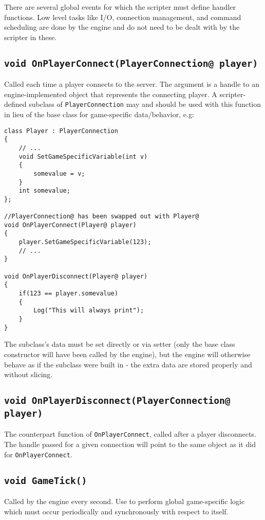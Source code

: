 \documentclass{book}
\begin{document}
There are several global events for which the scripter must define handler
functions. Low level tasks like I/O, connection management, and command
scheduling are done by the engine and do not need to be dealt with by the
scripter in these.

\subsection{\texttt{void OnPlayerConnect(PlayerConnection@ player)}}
  Called each time a player connects to the server. The argument is a handle to
  an engine-implemented object that represents the connecting player. A
  scripter-defined subclass of \texttt{PlayerConnection} may and should be used
  with this function in lieu of the base class for game-specific data/behavior,
  e.g:
\begin{lstlisting}
class Player : PlayerConnection
{
	// ...
	void SetGameSpecificVariable(int v)
	{
		somevalue = v;
	}
	int somevalue;
};

//PlayerConnection@ has been swapped out with Player@
void OnPlayerConnect(Player@ player)
{
	player.SetGameSpecificVariable(123);
	// ...
}

void OnPlayerDisconnect(Player@ player)
{
	if(123 == player.somevalue)
	{
		Log("This will always print");
    }
}
\end{lstlisting}

The subclass's data must be set directly or via setter (only the base class
constructor will have been called by the engine), but the engine will otherwise
behave as if the subclass were built in - the extra data are stored properly and
without slicing.


\subsection{\texttt{void OnPlayerDisconnect(PlayerConnection@ player)}}
  The counterpart function of \texttt{OnPlayerConnect}, called after a player
  disconnects. The handle passed for a given connection will point to the same
  object as it did for \texttt{OnPlayerConnect}.

\subsection{\texttt{void GameTick()}}
  Called by the engine every second. Use to perform global game-specific logic
  which must occur periodically and synchronously with respect to itself.
\end{document}
